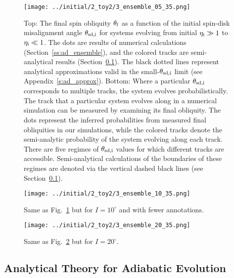 \documentclass[
        fleqn,
        usenatbib,
        referee,
    ]{mnras}
\begin{document}
\begin{figure}
    \centering
    \texttt{[image: ../initial/2\_toy2/3\_ensemble\_05\_35.png]}
    \caption{Top: The final spin obliquity $\theta_{\rm f}$ as a function of the
    initial spin-disk misalignment angle $\theta_{\rm sd, i}$ for systems
    evolving from initial $\eta_{\rm i} \gg 1$ to $\eta_{\rm i} \ll 1$. The dots
    are results of numerical calculations (Section~\ref{ss:ad_ensemble}), and
    the colored tracks are semi-analytical results
    (Section~\ref{ss:zone_transitions}). The black dotted lines represent
    analytical approximations valid in the small-$\theta_{\rm sd, i}$ limit (see
    Appendix~\ref{s:ad_approx}). Bottom: Where a particular $\theta_{\rm sd, i}$
    corresponds to multiple tracks, the system evolves probabilistically.
    The track that a particular system evolves along in a numerical simulation
    can be measured by examining its final obliquity. The dots represent the
    inferred probabilities from measured final obliquities in our simulations,
    while the colored tracks denote the semi-analytic probability of the system
    evolving along each track. There are five regimes of $\theta_{\rm sd, i}$
    values for which different tracks are accessible. Semi-analytical
    calculations of the boundaries of these regimes are denoted via the vertical
    dashed black lines (see
    Section~\ref{ss:zone_transitions}).}\label{fig:ad_ensemble}
\end{figure}
\begin{figure}
    \centering
    \texttt{[image: ../initial/2\_toy2/3\_ensemble\_10\_35.png]}
    \caption{Same as Fig.~\ref{fig:ad_ensemble} but for $I =
    10^\circ$ and with fewer annotations.}\label{fig:3_ensemble_10_35}
\end{figure}
\begin{figure}
    \centering
    \texttt{[image: ../initial/2\_toy2/3\_ensemble\_20\_35.png]}
    \caption{Same as Fig.~\ref{fig:3_ensemble_10_35} but for $I = 20^\circ$.
    }\label{fig:3_ensemble_20_35}
\end{figure}

\subsection{Analytical Theory for Adiabatic Evolution}\label{ss:zone_transitions}
\end{document}

